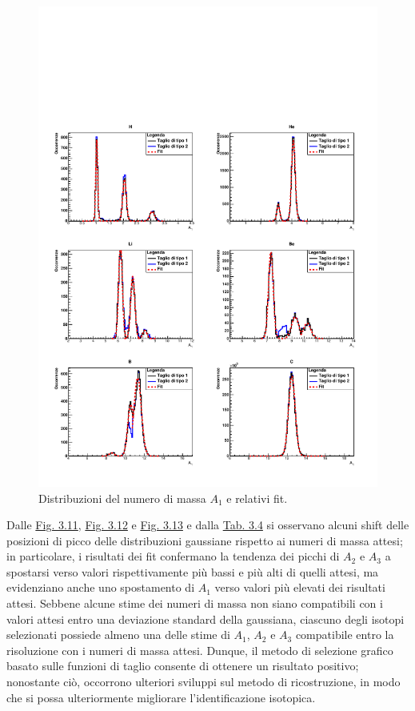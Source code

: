 \documentclass[12pt,a4paper,twoside]{report}
\begin{document}
	\begin{figure}[H]
		\centering
		\includegraphics[width=1.02\linewidth,center]{c_Total_black_blue1.pdf}
		\caption{Distribuzioni del numero di massa $A_1$ e relativi fit.}
		\label{fig:a1_fragments_final}
	\end{figure}
	Dalle \hyperref[fig:a1_fragments_final]{Fig. 3.11}, \hyperref[fig:a2_fragments_final]{Fig. 3.12} e \hyperref[fig:a3_fragments_final]{Fig. 3.13} e dalla \hyperref[tab:mass_numbers]{Tab. 3.4} si osservano alcuni shift delle posizioni di picco delle distribuzioni gaussiane rispetto ai numeri di massa attesi; in particolare, i risultati dei fit confermano la tendenza dei picchi di $A_2$ e $A_3$ a spostarsi verso valori rispettivamente più bassi e più alti di quelli attesi, ma evidenziano anche uno spostamento di $A_1$ verso valori più elevati dei risultati attesi. Sebbene alcune stime dei numeri di massa non siano compatibili con i valori attesi entro una deviazione standard della gaussiana, ciascuno degli isotopi selezionati possiede almeno una delle stime di $A_1$, $A_2$ e $A_3$ compatibile entro la risoluzione con i numeri di massa attesi. Dunque, il metodo di selezione grafico basato sulle funzioni di taglio consente di ottenere un risultato positivo; nonostante ciò, occorrono ulteriori sviluppi sul metodo di ricostruzione, in modo che si possa ulteriormente migliorare l'identificazione isotopica.
\end{document}
